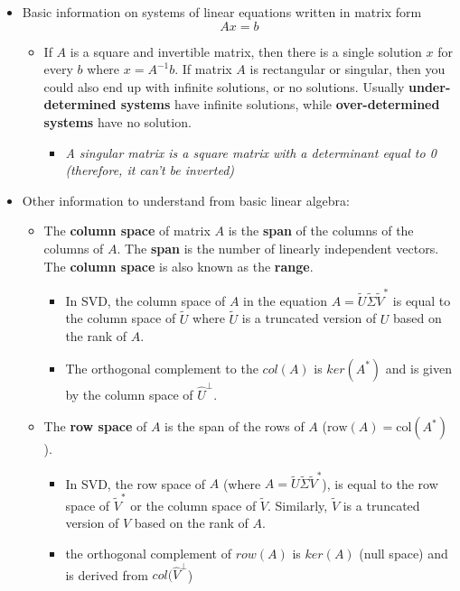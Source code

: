 \documentclass[11.5pt,a4paper]{article}
\begin{document}
\begin{itemize}
    \item Basic information on systems of linear equations written in matrix form
    \begin{equation*}
        Ax = b
    \end{equation*}
    \begin{itemize}
        \item If $A$ is a square and invertible matrix, then there is a single solution $x$ for every $b$ where $x=A^{-1}b$. If matrix $A$ is rectangular or singular, then you could also end up with infinite solutions, or no solutions. Usually \textbf{under-determined systems} have infinite solutions, while \textbf{over-determined systems} have no solution.
        \begin{itemize}
            \item \textit{A singular matrix is a square matrix with a determinant equal to 0 (therefore, it can't be inverted)}
        \end{itemize}
    \end{itemize}
    \item Other information to understand from basic linear algebra:
    \begin{itemize}
        \item The \textbf{column space} of matrix $A$ is the \textbf{span} of the columns of the columns of $A$. The \textbf{span} is the number of linearly independent vectors. The \textbf{column space} is also known as the \textbf{range}.
        \begin{itemize}
            \item In SVD, the column space of $A$ in the equation $A = \tilde{U}\tilde{\Sigma}\tilde{V}^*$ is equal to the column space of $\tilde{U}$ where $\tilde{U}$ is a truncated version of $U$ based on the rank of $A$.
            \item The orthogonal complement to the $col(A)$ is $ker(A^*)$ and is given by the column space of $\hat U^\perp$.
        \end{itemize}

        \item The \textbf{row space} of $A$ is the span of the rows of $A$ ($\text{row}(A) = \text{col}(A^*)$). \newline
        \begin{itemize}
            \item In SVD, the row space of $A$ (where $A = \tilde{U}\tilde{\Sigma}\tilde{V}^*$), is equal to the row space of $\tilde{V}^*$ or the column space of $\tilde{V}$. Similarly, $\tilde{V}$ is a truncated version of $V$ based on the rank of $A$.
            \item the orthogonal complement of $row(A)$ is $ker(A)$ (null space) and is derived from $col(\hat V^\perp$)
        \end{itemize}


\end{itemize}
\end{itemize}
\end{document}
